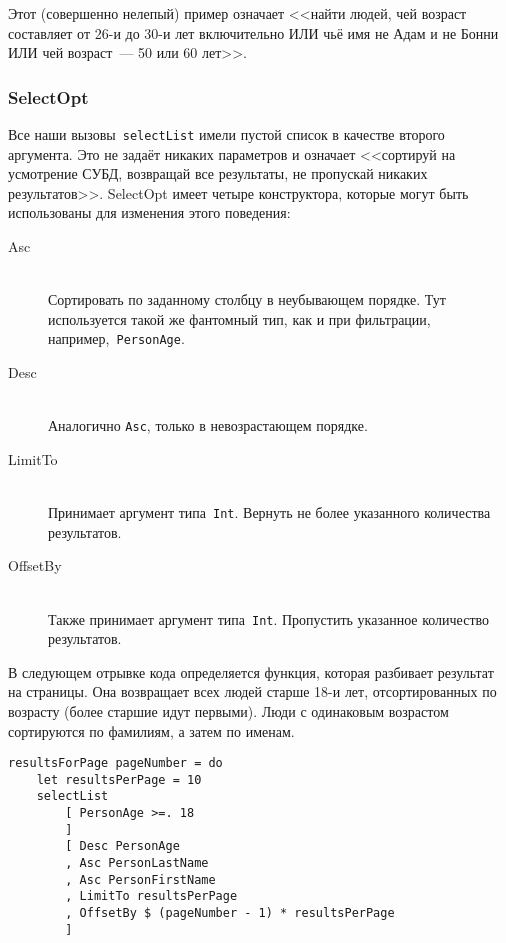 Этот (совершенно нелепый) пример означает <<найти людей, чей возраст составляет
от 26-и до 30-и лет включительно ИЛИ чьё имя не Адам и не Бонни ИЛИ чей
возраст~--- 50 или 60 лет>>.

\subsubsection{SelectOpt}

Все наши вызовы~\lstinline'selectList' имели пустой список в качестве второго аргумента.
Это не задаёт никаких параметров и означает <<сортируй на усмотрение СУБД,
возвращай все результаты, не пропускай никаких результатов>>. SelectOpt имеет
четыре конструктора, которые могут быть использованы для изменения этого
поведения:

\begin{description}
    \item[Asc] \hfill \\
        Сортировать по заданному столбцу в неубывающем порядке.
        Тут используется такой же фантомный тип, как и при фильтрации,
        например,~\lstinline'PersonAge'.

    \item[Desc] \hfill \\
        Аналогично \lstinline'Asc', только в невозрастающем порядке.

    \item[LimitTo] \hfill \\
        Принимает аргумент типа~\lstinline'Int'. Вернуть не более указанного
        количества результатов.

    \item[OffsetBy] \hfill \\
        Также принимает аргумент типа~\lstinline'Int'. Пропустить указанное
        количество результатов.
\end{description}

В следующем отрывке кода определяется функция, которая разбивает результат на
страницы. Она возвращает всех людей старше 18-и лет, отсортированных по
возрасту (более старшие идут первыми). Люди с одинаковым возрастом сортируются
по фамилиям, а затем по именам.

\begin{lstlisting}
resultsForPage pageNumber = do
    let resultsPerPage = 10
    selectList
        [ PersonAge >=. 18
        ]
        [ Desc PersonAge
        , Asc PersonLastName
        , Asc PersonFirstName
        , LimitTo resultsPerPage
        , OffsetBy $ (pageNumber - 1) * resultsPerPage
        ]
\end{lstlisting}

